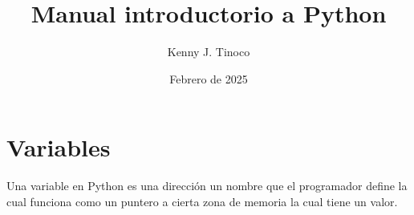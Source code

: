 \documentclass[12pt]{article}
\title{Manual introductorio a Python}
\author{Kenny J. Tinoco}
\date{Febrero de 2025}
\begin{document}
    \maketitle

    \section{Variables}
    Una variable en Python es una dirección un nombre que el programador define la cual funciona como un puntero a cierta zona de memoria la cual tiene un valor.
\end{document}

